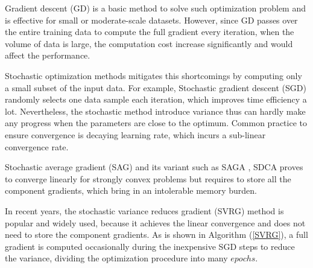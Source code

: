 \documentclass[conference]{IEEEtran}
\begin{document}
Gradient descent (GD) is a basic method to solve such optimization problem and is effective for small or moderate-scale datasets. However, since GD passes over the entire training data to compute the full gradient every iteration, when the volume of data is large, the computation cost increase significantly and would affect the performance. 

Stochastic optimization methods mitigates this shortcomings by computing only a small subset of the input data. For example, Stochastic gradient descent (SGD) randomly selects one data sample each iteration, which improves time efficiency a lot. Nevertheless, the stochastic method introduce variance thus can hardly make any progress when the parameters are close to the optimum. Common practice to ensure convergence is decaying learning rate, which incurs a sub-linear convergence rate.

Stochastic average gradient (SAG) \citep{Schmidt:2013ui} and its variant such as SAGA \citep{Defazio:2014vu}, SDCA \citep{ShalevShwartz:2016vy} proves to converge linearly for strongly convex problems but requires to store all the component gradients, which bring in an intolerable memory burden. 

In recent years, the stochastic variance reduces gradient (SVRG) \citep{Johnson:9MAvkbgy} method is popular and widely used, because it achieves the linear convergence and does not need to store the component gradients. As is shown in Algorithm (\ref{SVRG}), a full gradient is computed occasionally during the inexpensive SGD steps to reduce the variance, dividing the optimization procedure into many $epochs$.
\end{document}
